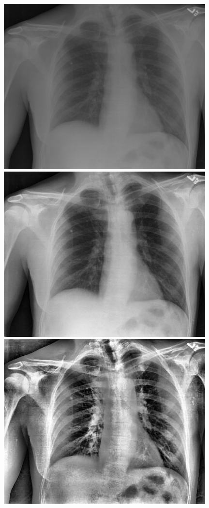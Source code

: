 \documentclass[a0,landscape,spanish]{a0poster}
\begin{document}
\begin{multicols}{3}
\begin{figure}[H]
    \centering
    \includegraphics[width=11cm]{chestoriginal}
    \hspace{1pt}
    \includegraphics[width=11cm]{chestclahe}
    \hspace{1pt}
    \includegraphics[width=11cm]{chestclahelicen}
  


\end{figure}
\end{multicols}
\end{document}
